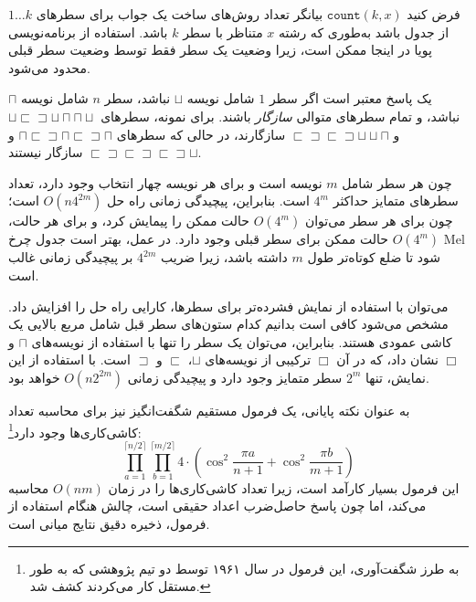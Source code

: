فرض کنید $\texttt{count}(k,x)$ بیانگر تعداد روش‌های
ساخت یک جواب برای سطرهای $1 \ldots k$
از جدول باشد به‌طوری که رشته $x$ متناظر با سطر $k$ باشد.
استفاده از برنامه‌نویسی پویا در اینجا ممکن است،
زیرا وضعیت یک سطر فقط توسط
وضعیت سطر قبلی محدود می‌شود.

یک پاسخ معتبر است اگر سطر $1$ شامل نویسه $\sqcup$ نباشد، سطر $n$ شامل نویسه $\sqcap$ نباشد، و تمام سطرهای متوالی \emph{سازگار} باشند.
برای نمونه، سطرهای
$\sqcup \sqsubset \sqsupset \sqcup \sqcap \sqcap \sqcup$ و
$\sqsubset \sqsupset \sqsubset \sqsupset \sqcup \sqcup \sqcap$ 
سازگارند، در حالی که سطرهای
$\sqcap \sqsubset \sqsupset \sqcap \sqsubset \sqsupset \sqcap$ و
$\sqsubset \sqsupset \sqsubset \sqsupset \sqsubset \sqsupset \sqcup$
سازگار نیستند.

چون هر سطر شامل $m$ نویسه است و برای هر نویسه چهار انتخاب وجود دارد، تعداد سطرهای متمایز حداکثر $4^m$ است.
بنابراین، پیچیدگی زمانی راه حل $O(n 4^{2m})$ است؛ چون برای هر سطر می‌توان $O(4^m)$ حالت ممکن را پیمایش کرد، و برای هر حالت، $O(4^m)$ حالت ممکن برای سطر قبلی وجود دارد.
در عمل، بهتر است جدول چرخ Mel شود تا ضلع کوتاه‌تر طول $m$ داشته باشد، زیرا ضریب $4^{2m}$ بر پیچیدگی زمانی غالب است.

می‌توان با استفاده از نمایش فشرده‌تر برای سطرها، کارایی راه حل را افزایش داد.
مشخص می‌شود کافی است بدانیم کدام ستون‌های سطر قبل شامل مربع بالایی یک کاشی عمودی هستند.
بنابراین، می‌توان یک سطر را تنها با استفاده از نویسه‌های $\sqcap$ و $\Box$ نشان داد، که در آن $\Box$ ترکیبی از نویسه‌های $\sqcup$، $\sqsubset$ و $\sqsupset$ است.
با استفاده از این نمایش، تنها $2^m$ سطر متمایز وجود دارد و پیچیدگی زمانی $O(n 2^{2m})$ خواهد بود.

به عنوان نکته پایانی، یک فرمول مستقیم شگفت‌انگیز نیز برای محاسبه تعداد کاشی‌کاری‌ها وجود دارد\footnote{به طرز شگفت‌آوری، این فرمول در سال ۱۹۶۱ توسط دو تیم پژوهشی \cite{kas61,tem61} که به طور مستقل کار می‌کردند کشف شد.}:
\[ \prod_{a=1}^{\lceil n/2 \rceil} \prod_{b=1}^{\lceil m/2 \rceil} 4 \cdot (\cos^2 \frac{\pi a}{n + 1} + \cos^2 \frac{\pi b}{m+1})\]
این فرمول بسیار کارآمد است، زیرا تعداد کاشی‌کاری‌ها را در زمان $O(nm)$ محاسبه می‌کند، اما چون پاسخ حاصل‌ضرب اعداد حقیقی است، چالش هنگام استفاده از فرمول، ذخیره دقیق نتایج میانی است.